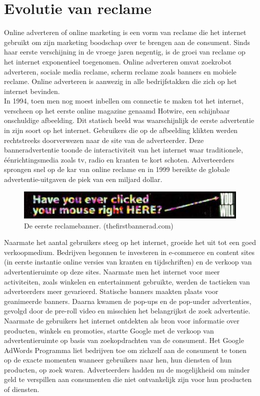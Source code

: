 \documentclass[pdftex,a4paper,12pt,twoside]{report}
\begin{document}
\section{Evolutie van reclame}
\label{sec:Evolutie van reclame}
Online adverteren of online marketing is een vorm van reclame die het internet gebruikt om zijn marketing boodschap over te brengen aan de consument. Sinds haar eerste verschijning in de vroege jaren negentig, is de groei van reclame op het internet exponentieel toegenomen. Online adverteren omvat zoekrobot adverteren, sociale media reclame, scherm reclame zoals banners en mobiele reclame. Online adverteren is aanwezig in alle bedrijfstakken die zich op het internet bevinden.
\\
In 1994, toen men nog moest inbellen om connectie te maken tot het internet, verscheen op het eerste online magazine genaamd Hotwire, een schijnbaar onschuldige afbeelding. Dit statisch beeld was waarschijnlijk de eerste advertentie in zijn soort op het internet. Gebruikers die op de afbeelding klikten werden rechtstreeks doorverwezen naar de site van de adverteerder. Deze banneradvertentie toonde de interactiviteit van het internet waar traditionele, éénrichtingsmedia zoals tv, radio en kranten te kort schoten. Adverteerders sprongen snel op de kar van online reclame en in 1999 bereikte de globale advertentie-uitgaven de piek van een miljard dollar.
\begin{figure}[h!]
\centering
\includegraphics[width=12cm]{img/firstbanner}
\caption{De eerste reclamebanner. (thefirstbannerad.com)}
\label{fig: Banner-Ads}
\end{figure}
Naarmate het aantal gebruikers steeg op het internet, groeide het uit tot een goed verkoopmedium. Bedrijven begonnen te investeren in e-commerce en content sites (in eerste instantie online versies van kranten en tijdschriften) en de verkoop van advertentieruimte op deze sites. Naarmate men het internet voor meer activiteiten, zoals winkelen en entertainment gebruikte, werden de tactieken van adverteerders meer gevarieerd. Statische banners maakten plaats voor geanimeerde banners. Daarna kwamen de pop-ups en de pop-under advertenties, gevolgd door de pre-roll video en misschien het belangrijkst de zoek advertentie. 
\\
Naarmate de gebruikers het internet ontdekten als bron voor informatie over producten, winkels en promoties, startte Google met de verkoop van advertentieruimte op basis van zoekopdrachten van de consument. Het Google AdWords Programma liet bedrijven toe om zichzelf aan de consument te tonen op de exacte momenten wanneer gebruikers naar hen, hun diensten of hun producten, op zoek waren. Adverteerders hadden nu de mogelijkheid om minder geld te verspillen aan consumenten die niet ontvankelijk zijn voor hun producten of diensten.
\end{document}
